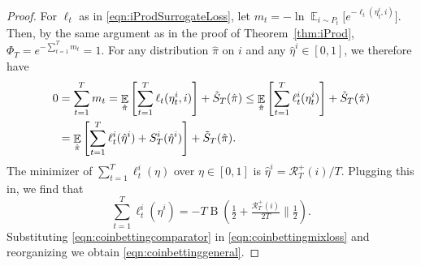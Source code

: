 \documentclass{colt2018} %
\DeclareMathOperator*{\E}{\mathbb{E}}
\DeclareMathOperator{\bernoullikl}{B}
\newcommand{\thalf}{\tfrac{1}{2}}       %
\newcommand{\sloss}{\ell}                       %
\newcommand{\sregret}{S}                        %
\newcommand{\altsregret}{\tilde{S}}             %
\newcommand{\etaopt}{\hat{\eta}}                %
\newcommand{\postpi}{\hat{\pi}}                 %
\newcommand{\regret}{\mathcal{R}}
\begin{document}
\begin{proof}
For $\sloss_t$ as in \eqref{eqn:iProdSurrogateLoss}, let $m_t = -\ln
\E_{i \sim P_t}\big[e^{-\sloss_t(\eta_t^i,i)}\big]$. Then, by the
same argument as in the proof of Theorem~\ref{thm:iProd}, $\Phi_T =
e^{-\sum_{t=1}^T m_t} = 1$. For any distribution $\postpi$ on $i$
and any $\etaopt^i \in [0,1]$, we therefore have
% 
\begin{align}
  0 &= \sum_{t=1}^T m_t
    = \E_{\postpi}\left[\sum_{t=1}^T \sloss_t(\eta_t^i,i)\right] +
      \altsregret_T(\postpi)
    \leq \E_{\postpi}\left[\sum_{t=1}^T \sloss_t^i(\eta_t^i)\right] +
      \altsregret_T(\postpi)\notag\\
    &= \E_{\postpi}\left[\sum_{t=1}^T \sloss_t^i(\etaopt^i)
      + \sregret_T^i(\etaopt^i)\right] +
      \altsregret_T(\postpi).\label{eqn:coinbettingmixloss}
\end{align}
% 
The minimizer of $\sum_{t=1}^T \sloss_t^i(\eta)$ over $\eta \in [0,1]$
is $\etaopt^i = \regret_T^+(i)/T$. Plugging this in, we find that
% 
\begin{equation}\label{eqn:coinbettingcomparator}
  \sum_{t=1}^T \sloss_t^i(\etaopt^i)
    = -T \bernoullikl(\thalf + \tfrac{\regret_T^+(i)}{2T} \| \thalf).
\end{equation}
% 
Substituting \eqref{eqn:coinbettingcomparator} in
\eqref{eqn:coinbettingmixloss} and reorganizing we obtain
\eqref{eqn:coinbettinggeneral}.


\end{proof}
\end{document}

